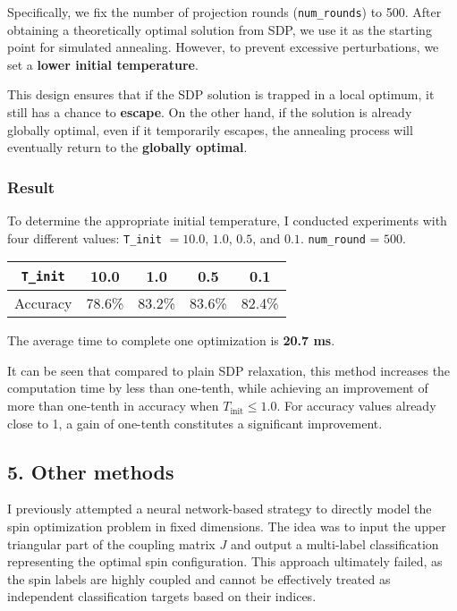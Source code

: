 \documentclass{article}
\begin{document}
Specifically, we fix the number of projection rounds (\texttt{num\_rounds}) to 500. After obtaining a theoretically optimal solution from SDP, we use it as the starting point for simulated annealing. However, to prevent excessive perturbations, we set a \textbf{lower initial temperature}.

This design ensures that if the SDP solution is trapped in a local optimum, it still has a chance to \textbf{escape}. On the other hand, if the solution is already globally optimal, even if it temporarily escapes, the annealing process will eventually return to the \textbf{globally optimal}.

\subsubsection*{Result}

To determine the appropriate initial temperature, I conducted experiments with four different values: \texttt{T\_init} $= 10.0$, $1.0$, $0.5$, and $0.1$. \texttt{num\_round} = $500$.

\begin{center}
\begin{tabular}{|c|c|c|c|c|}
\hline
\texttt{T\_init} & 10.0 & 1.0 & 0.5 & 0.1 \\
\hline
Accuracy & 78.6\% & 83.2\% & 83.6\% & 82.4\% \\
\hline
\end{tabular}
\end{center}

The average time to complete one optimization is \textbf{20.7 ms}.

It can be seen that compared to plain SDP relaxation, this method increases the computation time by less than one-tenth, while achieving an improvement of more than one-tenth in accuracy when $T_{\text{init}} \leq 1.0$. For accuracy values already close to 1, a gain of one-tenth constitutes a significant improvement.

\subsection*{5. Other methods}

I previously attempted a neural network-based strategy to directly model the spin optimization problem in fixed dimensions. The idea was to input the upper triangular part of the coupling matrix $J$ and output a multi-label classification representing the optimal spin configuration. This approach ultimately failed, as the spin labels are highly coupled and cannot be effectively treated as independent classification targets based on their indices.
\end{document}
